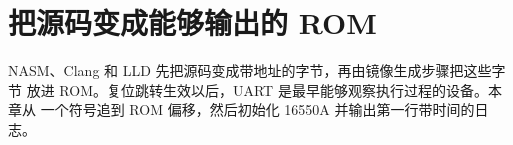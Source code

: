 \chapter{把源码变成能够输出的 ROM}

NASM、Clang 和 LLD 先把源码变成带地址的字节，再由镜像生成步骤把这些字节
放进 ROM。复位跳转生效以后，UART 是最早能够观察执行过程的设备。本章从
一个符号追到 ROM 偏移，然后初始化 16550A 并输出第一行带时间的日志。











